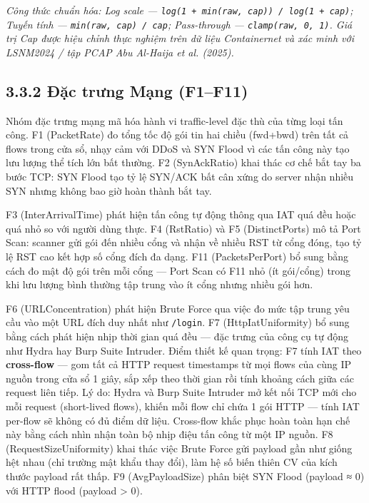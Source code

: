 \documentclass[12pt,a4paper,twoside]{report}
\begin{document}
{\textit{Công thức chuẩn hóa: Log scale — \texttt{log(1 + min(raw, cap)) / log(1 + cap)}; Tuyến tính — \texttt{min(raw, cap) / cap}; Pass-through — \texttt{clamp(raw, 0, 1)}. Giá trị Cap được hiệu chỉnh thực nghiệm trên dữ liệu Containernet và xác minh với LSNM2024 / tập PCAP Abu Al-Haija et al. (2025).}

\subsection{3.3.2 Đặc trưng Mạng (F1–F11)}

Nhóm đặc trưng mạng mã hóa hành vi traffic-level đặc thù của từng loại tấn công. F1 (PacketRate) đo tổng tốc độ gói tin hai chiều (fwd+bwd) trên tất cả flows trong cửa sổ, nhạy cảm với DDoS và SYN Flood vì các tấn công này tạo lưu lượng thể tích lớn bất thường. F2 (SynAckRatio) khai thác cơ chế bắt tay ba bước TCP: SYN Flood tạo tỷ lệ SYN/ACK bất cân xứng do server nhận nhiều SYN nhưng không bao giờ hoàn thành bắt tay.

F3 (InterArrivalTime) phát hiện tấn công tự động thông qua IAT quá đều hoặc quá nhỏ so với người dùng thực. F4 (RstRatio) và F5 (DistinctPorts) mô tả Port Scan: scanner gửi gói đến nhiều cổng và nhận về nhiều RST từ cổng đóng, tạo tỷ lệ RST cao kết hợp số cổng đích đa dạng. F11 (PacketsPerPort) bổ sung bằng cách đo mật độ gói trên mỗi cổng — Port Scan có F11 nhỏ (ít gói/cổng) trong khi lưu lượng bình thường tập trung vào ít cổng nhưng nhiều gói hơn.

F6 (URLConcentration) phát hiện Brute Force qua việc đo mức tập trung yêu cầu vào một URL đích duy nhất như \texttt{/login}. F7 (HttpIatUniformity) bổ sung bằng cách phát hiện nhịp thời gian quá đều — đặc trưng của công cụ tự động như Hydra hay Burp Suite Intruder. Điểm thiết kế quan trọng: F7 tính IAT theo \textbf{cross-flow} — gom tất cả HTTP request timestamps từ mọi flows của cùng IP nguồn trong cửa sổ 1 giây, sắp xếp theo thời gian rồi tính khoảng cách giữa các request liên tiếp. Lý do: Hydra và Burp Suite Intruder mở kết nối TCP mới cho mỗi request (short-lived flows), khiến mỗi flow chỉ chứa 1 gói HTTP — tính IAT per-flow sẽ không có đủ điểm dữ liệu. Cross-flow khắc phục hoàn toàn hạn chế này bằng cách nhìn nhận toàn bộ nhịp điệu tấn công từ một IP nguồn. F8 (RequestSizeUniformity) khai thác việc Brute Force gửi payload gần như giống hệt nhau (chỉ trường mật khẩu thay đổi), làm hệ số biến thiên CV của kích thước payload rất thấp. F9 (AvgPayloadSize) phân biệt SYN Flood (payload ≈ 0) với HTTP flood (payload > 0).

}
\end{document}
